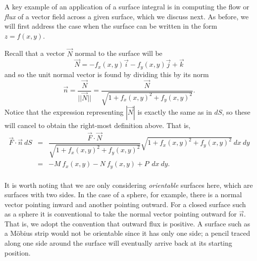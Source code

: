 A key example of an application of a surface integral is in computing the flow or \emph{flux} of a vector field across a given surface, which we discuss next.  As before, we will first address the case when the surface can be written in the form $z = f(x,y)$.\\


Recall that a vector $\vec N$ normal to the surface will be
$$\vec N = -f_x(x,y) \vec i - f_y(x,y) \vec j + \vec k$$
and so the unit normal vector is found by dividing this by its norm
$$\vec n = \dfrac{\vec N}{||\vec N||} = \dfrac{\vec N}{\sqrt{1 + f_x(x,y)^2 + f_y(x,y)^2}}.$$
Notice that the expression representing $| \vec N |$ is exactly the same as in $dS$, so these will cancel to obtain the right-most definition above. That is,
\begin{eqnarray*}
\vec F \cdot \vec n \: dS & = & \dfrac{\vec F \cdot \vec N}{\sqrt{1 + f_x(x,y)^2 + f_y(x,y)^2}} \sqrt{1 + f_x(x,y)^2 + f_y(x,y)^2} \: dx \: dy \\
& = & -M \: f_x(x,y) - N \: f_y(x,y) + P \: \: dx \: dy.
\end{eqnarray*}\\

It is worth noting that we are only considering \emph{orientable} surfaces here, which are surfaces with two sides. In the case of a sphere, for example, there is a normal vector pointing inward and another pointing outward. For a closed surface such as a sphere it is conventional to take the normal vector pointing outward for $\vec n$. That is, we adopt the convention that outward flux is positive. A surface such as a M\"obius strip would not be orientable since it has only one side; a pencil traced along one side around the surface will eventually arrive back at its starting position.\\

